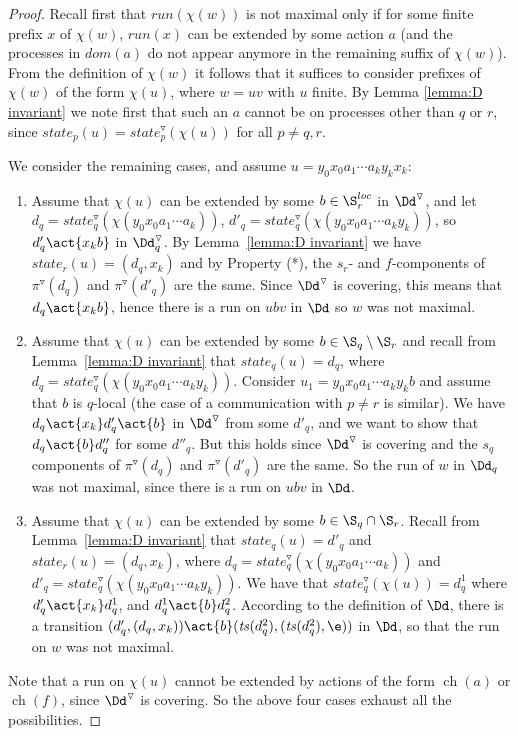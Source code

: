 \documentclass[10pt,a4paper]{article}
\newcommand{\run}{\mathit{run}}
\newcommand{\ts}{\mathit{ts}}
\newcommand{\red}[1]{#1^\triangledown}
\newcommand{\Sloc}{\S^{loc}}
\newcommand{\state}{\mathit{state}}
\newcommand{\loc}{\mathit{dom}}
\newcommand{\ch}{\mathop{ch}}
\begin{document}
\begin{proof}
  Recall first that $\run(\chi(w))$ is not maximal only if for some
  finite prefix $x$ of $\chi(w)$, $\run(x)$ can be extended by some
  action $a$ (and the processes in $\loc(a)$ do not appear anymore in
  the remaining suffix of $\chi(w)$). From the definition of $\chi(w)$
  it follows that it suffices to consider prefixes of $\chi(w)$
  of the form $\chi(u)$, where $w=uv$ with $u$ finite. By
  Lemma \ref{lemma:D invariant} we note first that such an $a$ cannot be on
  processes other than $q$ or $r$, since
  $\state_p(u)=\red\state_p(\chi(u))$ for all $p \not= q,r$.

We consider the remaining cases, and assume $u=y_0x_0a_1 \cdots a_k y_kx_k$:

\begin{enumerate}
\item Assume that $\chi(u)$ can be extended by some $b \in\Sloc_r$ in
  $\red\Dd$, and let $d_q=\red\state_q(\chi(y_0x_0a_1 \cdots a_k))$,
  $d'_q=\red\state_q(\chi(y_0x_0a_1 \cdots a_ky_k))$, so $d'_q
  \act{x_kb}$ in $\red\Dd_q$.  By
  Lemma~\ref{lemma:D invariant} we have $\state_r(u)=(d_q,x_k)$ and by
  Property (*), the $s_r$- and $f$-components of $\red\pi(d_q)$ and
  $\red\pi(d'_q)$ are the same. Since $\red\Dd$ is covering, this
  means that $d_q \act{x_kb}$, hence there is a run on $u bv$ in $\Dd$
  so $w$ was not maximal.
\item Assume that $\chi(u)$ can be extended by some $b \in \S_q
  \setminus \S_r$ and recall from Lemma~\ref{lemma:D invariant} that
  $\state_q(u)= d_q$, where $d_q=\red\state_q(\chi(y_0x_0a_1 \cdots
  a_ky_k))$. Consider 
  $u_1=y_0x_0a_1 \cdots a_ky_kb$ and assume that $b$ is $q$-local (the
  case of a communication with $p \not=r$ is similar). We have $d_q
  \act{x_k} d'_q \act{b}$ in $\red\Dd$ from some $d'_q$, and we want
  to show that $d_q 
  \act{b} d''_q$ for some $d''_q$. But this holds since $\red\Dd$ is
  covering and the $s_q$ components of $\red\pi(d_q)$ and
  $\red\pi(d'_q)$ are the same. So the run of $w$ in $\Dd_q$ was not
  maximal, since there is a run on $ubv$ in $\Dd$. 
\item Assume that $\chi(u)$ can be extended by some $b \in \S_q \cap
  \S_r$. Recall from Lemma~\ref{lemma:D invariant} that
  $\state_q(u)= d'_q$ and $\state_r(u)=(d_q, x_k)$, where
  $d_q=\red\state_q(\chi(y_0x_0a_1 \cdots a_k))$ and
  $d'_q=\red\state_q(\chi(y_0x_0a_1 \cdots a_ky_k))$. We have that
  $\red\state_q(\chi(u))=d^1_q$ where $d'_q \act{x_k} d^1_q$, and
  $d^1_q \act{b} d^2_q$. According to the definition of $\Dd$, there is a
  transition $(d'_q,(d_q,x_k)) \act{b} (\ts(d^2_q),(\ts(d^2_q),\e))$
  in $\Dd$, so that the run on $w$ was not maximal.
\end{enumerate}
Note that a run on $\chi(u)$
cannot be extended by actions of the form $\ch(a)$ or $\ch(f)$, since
$\red\Dd$ is covering. So the above four cases exhaust all the possibilities.
\end{proof}
\end{document}
